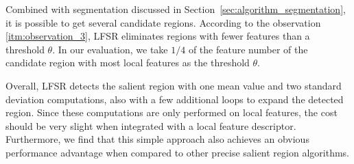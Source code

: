Combined with segmentation discussed in Section~\ref{sec:algorithm_segmentation}, it is possible to get several candidate regions. According to the observation \ref{itm:observation_3}, LFSR eliminates regions with fewer features than a threshold $\theta$. In our evaluation, we take $1/4$ of the feature number of the candidate region with most local features as the threshold $\theta$.

Overall, LFSR detects the salient region with one mean value and two standard deviation computations, also with a few additional loops to expand the detected region. Since these computations are only performed on local features, the cost should be very slight when integrated with a local feature descriptor. Furthermore, we find that this simple approach also achieves an obvious performance advantage when compared to other precise salient region algorithms.